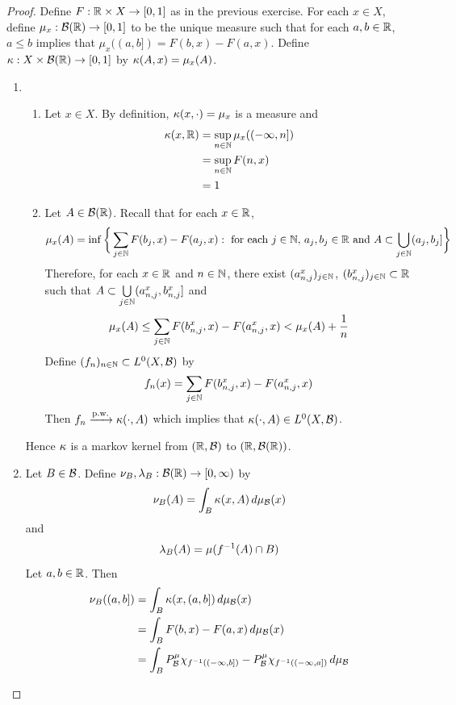 \documentclass{book}
\begin{document}
	\begin{proof} Define $F:\mathbb{R} \times X \rightarrow [0,1]$ as in the previous exercise. For each $x \in X$, define $\mu_x: \mathcal{B}(\mathbb{R}) \rightarrow [0,1]$ to be the unique measure such that for each $a, b \in \mathbb{R}$, $a \leq b$ implies that $\mu_x((a,b]) = F(b, x) - F(a, x)$. Define $\kappa: X \times \mathcal{B}(\mathbb{R}) \rightarrow [0,1]$ by $\kappa(A, x) = \mu_x(A)$. \\
		\begin{enumerate}
			\item \
			\begin{enumerate}
				\item Let $x \in X$. By definition, $\kappa(x, \cdot) = \mu_x$ is a measure and 
				\begin{align*}
					\kappa(x, \mathbb{R}) 
					& = \sup\limits_{n \in \mathbb{N}} \mu_x((-\infty, n])\\
					& = \sup\limits_{n \in \mathbb{N}} F(n, x) \\
					& = 1 
				\end{align*}
				\item Let $A \in \mathcal{B}(\mathbb{R})$. Recall that for each $x \in \mathbb{R}$,
				$$\mu_x(A) = \inf \bigg \{ \sum\limits_{j \in \mathbb{N}} F(b_j, x) - F(a_j, x): \text{ for each $j \in \mathbb{N}$, $a_j, b_j \in \mathbb{R}$ and } A \subset \bigcup\limits_{j \in \mathbb{N}} (a_j, b_j] \bigg \}$$ 
				Therefore, for each $x \in \mathbb{R}$ and $n \in \mathbb{N}$, there exist $(a^x_{n,j})_{j \in \mathbb{N}}$, $(b^x_{n,j})_{j \in \mathbb{N}} \subset \mathbb{R}$ such that $A \subset \bigcup\limits_{j \in \mathbb{N}} (a^x_{n,j}, b^x_{n,j}]$ and 
				$$\mu_x(A) \leq \sum\limits_{j \in \mathbb{N}} F(b^x_{n,j}, x) - F(a^x_{n,j}, x) < \mu_x(A) + \frac{1}{n}$$
				Define $(f_n)_{n \in \mathbb{N}} \subset L^0(X, \mathcal{B})$ by $$f_n(x) = \sum\limits_{j \in \mathbb{N}} F(b^x_{n,j}, x) - F(a^x_{n,j}, x)$$
				Then $f_n \xrightarrow{\text{p.w.}} \kappa(\cdot, A)$ which implies that $\kappa(\cdot, A) \in L^0(X, \mathcal{B})$. 
			\end{enumerate}
			Hence $\kappa$ is a markov kernel from $(\mathbb{R}, \mathcal{B})$ to $(\mathbb{R}, \mathcal{B}(\mathbb{R}))$.\\
			\item Let $B \in \mathcal{B}$. Define $\nu_B, \lambda_{B}:\mathcal{B}(\mathbb{R}) \rightarrow [0,\infty)$ by 
			$$\nu_B(A) = \int_B \kappa(x, A) \, d \mu_{\mathcal{B}}(x)$$ 
			and
			$$\lambda_B(A) = \mu(f^{-1}(A) \cap B)$$ 
			Let $a,b \in \mathbb{R}$. Then 
			\begin{align*}
				\nu_B((a,b]) 
				& = \int_B \kap(x, (a,b]) \dmu_{\MB}(x) \\
				& = \int_{B} F(b, x) - F(a,x) \dmu_{\MB}(x) \\
				& = \int_{B} P^{\mu}_{\MB}\chi_{f^{-1}((-\infty, b])} - P^{\mu}_{\MB}\chi_{f^{-1}((-\infty, a])} \dmu_{\MB} \\

\end{align*}
\end{enumerate}
\end{proof}
\end{document}
